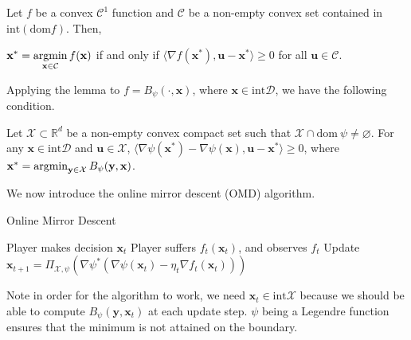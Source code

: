 \documentclass[12pt, a4paper]{report}
\begin{document}
\begin{lem}
Let $f$ be a convex $\mathcal{C}^1$ function and $\mathcal{C}$ be a non-empty convex set contained in $\mathrm{int} (\mathrm{dom} f)$. Then, 
\begin{center}
    $\displaystyle \mathbf{x}^{*} = \operatorname*{argmin}_{\mathbf{x} \in \mathcal{C}} f(\mathbf{x})$ if and only if $\langle \nabla f(\mathbf{x}^*), \mathbf{u} - \mathbf{x}^* \rangle \geq 0$ for all $\mathbf{u} \in \mathcal{C}$.
\end{center}
\end{lem}
Applying the lemma to $f = B_\psi(\cdot, \mathbf{x})$, where $\mathbf{x} \in \mathrm{int} \mathcal{D}$, we have the following condition.
\begin{prop} \label{prop:optimal}
Let $\mathcal{X} \subset \mathbb{R}^d$ be a non-empty convex compact set such that $\mathcal{X} \cap \mathrm{dom}\ \psi \neq \varnothing$.
For any $\mathbf{x} \in \mathrm{int} \mathcal{D}$ and $\mathbf{u} \in \mathcal{X}$, $\langle \nabla \psi(\mathbf{x}^{*}) - \nabla \psi(\mathbf{x}), \mathbf{u} - \mathbf{x^{*}} \rangle \geq 0$, where $\mathbf{x}^* = \operatorname*{argmin}_{\mathbf{y} \in \mathcal{X}} B_\psi(\mathbf{y}, \mathbf{x})$.
\end{prop}
We now introduce the online mirror descent (OMD) algorithm. 
\begin{algorithm} 
\caption{Online Mirror Descent} \label{alg:omd}
\begin{algorithmic}[1]
\State Player makes decision $\mathbf{x}_t$
\State Player suffers $f_t(\mathbf{x}_t)$, and observes $f_t$
\State Update $ \mathbf{x}_{t+1} = \Pi_{\mathcal{X}, \psi}(\nabla \psi^{*}(\nabla \psi(\mathbf{x}_t) - \eta_t \nabla f_t(\mathbf{x}_t)))$
\EndFor
\end{algorithmic}
\end{algorithm}
\begin{rem}
Note in order for the algorithm to work, we need $\mathbf{x}_{t} \in \mathrm{int} \mathcal{X}$ because we should be able to compute $B_\psi(\mathbf{y}, \mathbf{x}_t)$ at each update step. $\psi$ being a Legendre function ensures that the minimum is not attained on the boundary.
\end{rem}
\end{document}
